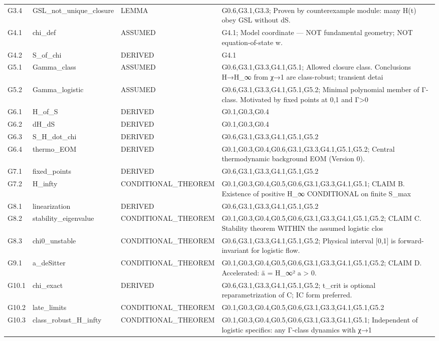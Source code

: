 \documentclass[11pt,a4paper]{article}
\theoremstyle{remark}\newtheorem*{caution}{Caution}
\begin{document}
{\begin{longtable}{@{}p{2.1cm}p{3.1cm}p{2.6cm}p{6cm}@{}}
G3.4 & GSL\_not\_unique\_closure & LEMMA & G0.6,G3.1,G3.3; Proven by counterexample module: many H(t) obey GSL without dS. \\
G4.1 & chi\_def & ASSUMED & G4.1; Model coordinate — NOT fundamental geometry; NOT equation-of-state w. \\
G4.2 & S\_of\_chi & DERIVED & G4.1 \\
G5.1 & Gamma\_class & ASSUMED & G0.6,G3.1,G3.3,G4.1,G5.1; Allowed closure class. Conclusions H→H\_∞ from χ→1 are class-robust; transient detai \\
G5.2 & Gamma\_logistic & ASSUMED & G0.6,G3.1,G3.3,G4.1,G5.1,G5.2; Minimal polynomial member of Γ-class. Motivated by fixed points at 0,1 and Γ>0  \\
G6.1 & H\_of\_S & DERIVED & G0.1,G0.3,G0.4 \\
G6.2 & dH\_dS & DERIVED & G0.1,G0.3,G0.4 \\
G6.3 & S\_H\_dot\_chi & DERIVED & G0.6,G3.1,G3.3,G4.1,G5.1,G5.2 \\
G6.4 & thermo\_EOM & DERIVED & G0.1,G0.3,G0.4,G0.6,G3.1,G3.3,G4.1,G5.1,G5.2; Central thermodynamic background EOM (Version 0). \\
G7.1 & fixed\_points & DERIVED & G0.6,G3.1,G3.3,G4.1,G5.1,G5.2 \\
G7.2 & H\_infty & CONDITIONAL\_THEOREM & G0.1,G0.3,G0.4,G0.5,G0.6,G3.1,G3.3,G4.1,G5.1; CLAIM B. Existence of positive H\_∞ CONDITIONAL on finite S\_max \\
G8.1 & linearization & DERIVED & G0.6,G3.1,G3.3,G4.1,G5.1,G5.2 \\
G8.2 & stability\_eigenvalue & CONDITIONAL\_THEOREM & G0.1,G0.3,G0.4,G0.5,G0.6,G3.1,G3.3,G4.1,G5.1,G5.2; CLAIM C. Stability theorem WITHIN the assumed logistic clos \\
G8.3 & chi0\_unstable & CONDITIONAL\_THEOREM & G0.6,G3.1,G3.3,G4.1,G5.1,G5.2; Physical interval [0,1] is forward-invariant for logistic flow. \\
G9.1 & a\_deSitter & CONDITIONAL\_THEOREM & G0.1,G0.3,G0.4,G0.5,G0.6,G3.1,G3.3,G4.1,G5.1,G5.2; CLAIM D. Accelerated: ä = H\_∞² a > 0. \\
G10.1 & chi\_exact & DERIVED & G0.6,G3.1,G3.3,G4.1,G5.1,G5.2; t\_crit is optional reparametrization of C; IC form preferred. \\
G10.2 & late\_limits & CONDITIONAL\_THEOREM & G0.1,G0.3,G0.4,G0.5,G0.6,G3.1,G3.3,G4.1,G5.1,G5.2 \\
G10.3 & class\_robust\_H\_infty & CONDITIONAL\_THEOREM & G0.1,G0.3,G0.4,G0.5,G0.6,G3.1,G3.3,G4.1,G5.1; Independent of logistic specifics: any Γ-class dynamics with χ→1 \\

\end{longtable}}
\end{document}
